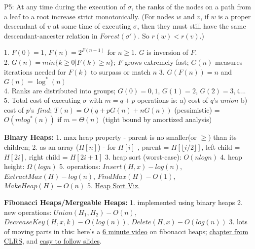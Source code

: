 P5: At any time during the execution of $\sigma$, the ranks of the nodes
on a path from a leaf to a root increase strict monotonically.
(For nodes $w$ and $v$, if $w$ is a proper descendant of $v$ at some time of executing $\sigma$,
then they must still have the same descendant-ancester relation in $Forest(\sigma')$. So $r(w)<r(v)$.)

1. $F(0) = 1$, $F(n) = 2^{F(n-1)}$ for $n \ge 1$. $G$ is inversion of $F$. \\
2. $G(n) = min\{k \ge 0 | F(k) \ge n\}$; $F$ grows extremely fast; $G(n)$ measures iterations needed for $F(k)$ to surpass or match $n$ 
3. $G(F(n)) = n$ and $G(n) = \log^*(n)$\\
4. Ranks are distributed into groups; $G(0) = {0,1}$, $G(1) = {2}$, $G(2) = {3,4}$...\\
5. Total cost of executing $\sigma$ with $m=q+p$ operations is:  
a) cost of $q$'s $union$ b) cost of $p$'s $find$; $T(n) = O(q+pG(n)+nG(n))$ (pessimistic) = $O(mlog^*(n))$ if $m=\Theta(n)$ (tight bound by amortized analysis)


\textbf{Binary Heaps:} 
1. max heap property - parent is no smaller(or $\ge$) than its children;
2. as an array ($H[n]$) - for $H[i]$ , parent = $H[\lfloor i/2 \rfloor]$, 
left child = $H[2i]$, right child = $H[2i+1]$
3. heap sort (worst-case): $O(nlogn)$
4. heap height: $\Omega(logn)$
5. operations: $Insert(H, x)-log(n)$, $ExtractMax(H)-log(n)$, 
$FindMax(H)-O(1)$, $MakeHeap(H)-O(n)$
5. \href{https://www.mimuw.edu.pl/~erykk/algovis/heapsort.html}{Heap Sort Viz.}

\textbf{Fibonacci Heaps/Mergeable Heaps: }
1. implemented using binary heaps
2. new operations: $Union(H_1,H_2)-O(n)$, $DecreaseKey(H,x,k)-O(log(n))$, 
$Delete(H,x)-O(log(n))$
3. lots of moving parts in this: here's a \href{https://www.youtube.com/watch?v=0vsX3ZQFREM}{6 minute video} on fibonacci heaps; 
\href{https://www.utsc.utoronto.ca/~atafliovich/cscb63/content/week10/clrs_fibonacci_chapter.pdf}{chapter from CLRS}, 
and \href{https://www.cs.princeton.edu/~wayne/teaching/fibonacci-heap.pdf}{easy to follow slides}.

% 
